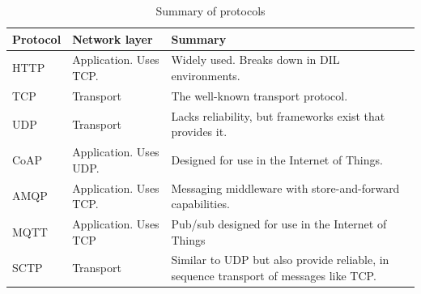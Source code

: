 \begin{table}[h]
\begin{tabularx}{\textwidth}{| l | l | X |}
\hline
  \textbf{Protocol} & \textbf{Network layer} & \textbf{Summary} \\ \hline
  HTTP & Application. Uses TCP. &  Widely used. Breaks down in DIL environments.\\ \hline
  TCP & Transport & The well-known transport protocol. \\ \hline
  UDP & Transport & Lacks reliability, but frameworks exist that provides it. \\ \hline
  CoAP & Application. Uses UDP. & Designed for use in the Internet of Things. \\ \hline
  AMQP & Application. Uses TCP. &  Messaging middleware with store-and-forward capabilities.\\ \hline
  MQTT & Application. Uses TCP & Pub/sub designed for use in the Internet of Things\\ \hline
  SCTP & Transport & Similar to UDP but also provide reliable, in sequence transport of messages like TCP. \\ \hline
\end{tabularx}
\caption{Summary of protocols}
\end{table}
